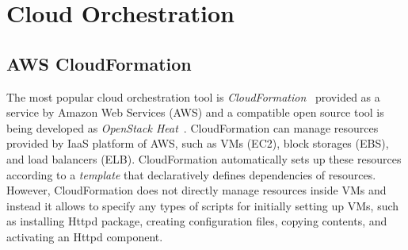 \documentclass[12pt]{report}
\begin{document}
\chapter{Cloud Orchestration}
\label{chap:cloudorch}

\section{AWS CloudFormation}
\label{sec:aws}
The most popular cloud orchestration tool is {\it
  CloudFormation}~\cite{CloudFormation} provided as a service by
Amazon Web Services (AWS) and a compatible open source tool is being
developed as {\it OpenStack Heat}~\cite{Heat}. CloudFormation can
manage resources provided by IaaS platform of AWS, such as VMs (EC2),
block storages (EBS), and load balancers (ELB). CloudFormation
automatically sets up these resources according to a {\it template}
that declaratively defines dependencies of resources. However,
CloudFormation does not directly manage resources inside VMs and
instead it allows to specify any types of scripts for initially
setting up VMs, such as installing Httpd package, creating
configuration files, copying contents, and activating an Httpd
component.
\end{document}
